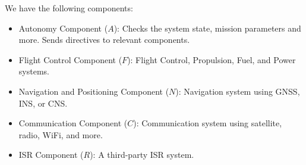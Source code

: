 We have the following components:
\begin{itemize}
	\item Autonomy Component ($A$): 
		Checks the system state, mission parameters and more. 
		Sends directives to relevant components.
	\item Flight Control Component ($F$): 
		Flight Control, Propulsion, Fuel, and Power systems.
	\item Navigation and Positioning Component ($N$): 
		Navigation system using GNSS, INS, or CNS. 
	\item Communication Component ($C$): 
		Communication system using satellite, radio, WiFi, and more.
	\item ISR Component ($R$): 
		A third-party ISR system.
\end{itemize}

